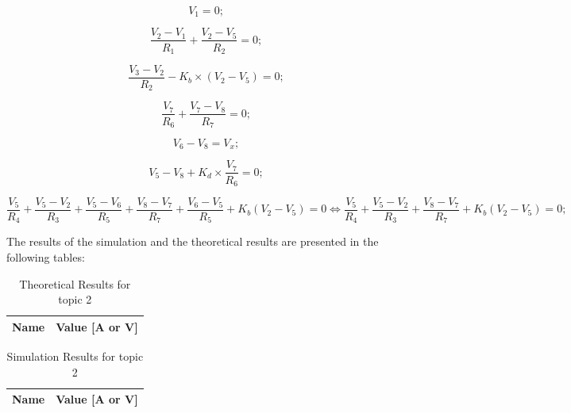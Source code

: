 \begin{equation} 
  V_1=0          ;
  \label{eq:2.1}
\end{equation}

\begin{equation} 
  \frac{V_2-V_1}{R_1}+\frac{V_2-V_5}{R_2}=0          ;
  \label{eq:3.1}
\end{equation}

\begin{equation} 
  \frac{V_3-V_2}{R_2}-K_b\times(V_2-V_5)=0          ;
  \label{eq:4.1}
\end{equation}

\begin{equation} 
  \frac{V_7}{R_6}+\frac{V_7-V_8}{R_7}=0          ;
  \label{eq:6.1}
\end{equation}

\begin{equation} 
  V_6-V_8=V_x         ;
  \label{eq:7.1}
\end{equation}

\begin{equation} 
  V_5-V_8+K_d\times\frac{V_7}{R_6}=0          ;
  \label{eq:8.1}
\end{equation}

\begin{equation} 
  \frac{V_5}{R_4}+\frac{V_5-V_2}{R_3}+\frac{V_5-V_6}{R_5}+\frac{V_8-V_7}{R_7}+\frac{V_6-V_5}{R_5}+K_b(V_2-V_5)=0 \iff \frac{V_5}{R_4}+\frac{V_5-V_2}{R_3}+\frac{V_8-V_7}{R_7}+K_b(V_2-V_5)=0        ;
  \label{eq:8.2}
\end{equation}

The results of the simulation and the theoretical results are presented in the following tables:

\begin{table}[h]
  \centering
  \begin{tabular}{|l|r|}
    \hline    
    {\bf Name} & {\bf Value [A or V]} \\ \hline
    
  \end{tabular}
  \caption{Theoretical Results for topic 2}
  \label{tab:tabela3}
\end{table}

\begin{table}[h]
  \centering
  \begin{tabular}{|l|r|}
    \hline    
    {\bf Name} & {\bf Value [A or V]} \\ \hline
    					
  \end{tabular}
  \caption{Simulation Results for topic 2}
  \label{tab:tabela4}
\end{table}

